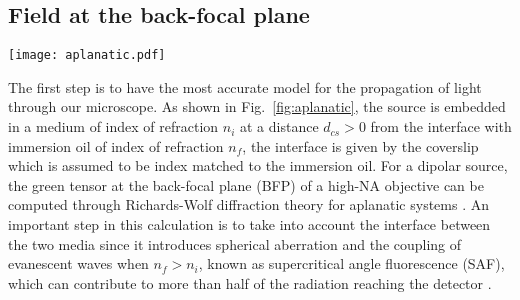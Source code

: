 \documentclass[reprint,aps,pra,superscriptaddress,
amsmath,amssymb]{revtex4-1}
\begin{document}
\subsection{Field at the back-focal plane}

\begin{figure*}
  \centering
  \texttt{[image: aplanatic.pdf]}
  \caption{\label{fig:setup} . }
\end{figure*}

The first step is to have the most accurate model for the propagation 
of light through our microscope. As shown in Fig.~\ref{fig:aplanatic}, 
the source is embedded in a medium of index of refraction $n_i$ at a 
distance $d_{cs}>0$ from the interface with immersion oil of index of 
refraction $n_f$, the interface is given by the coverslip which is assumed
to be index matched to the immersion oil. For a dipolar source, the green 
tensor at the back-focal plane (BFP) of a high-NA objective can be 
computed through Richards-Wolf diffraction 
theory for aplanatic systems \cite{richards1959electromagnetic,
novotny2006principles}. An important step in this calculation is to  
take into account the interface between the two media since it introduces 
spherical aberration and the coupling of evanescent waves when $n_f > n_i$,
known as supercritical angle fluorescence (SAF), 
which  can contribute to more than 
half of the radiation reaching the detector \cite{hellen1987fluorescence,
axelrod2001total,axelrod2013evanescent}.

\end{document}
